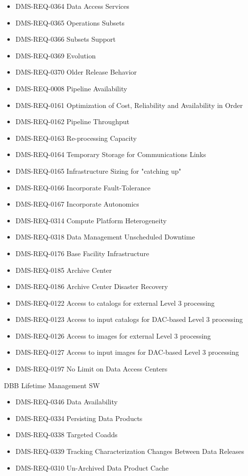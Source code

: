 \begin{itemize}
\item DMS-REQ-0364 Data Access Services
\item DMS-REQ-0365 Operations Subsets
\item DMS-REQ-0366 Subsets Support
\item DMS-REQ-0369 Evolution
\item DMS-REQ-0370 Older Release Behavior
\item DMS-REQ-0008 Pipeline Availability
\item DMS-REQ-0161 Optimization of Cost, Reliability and Availability in Order
\item DMS-REQ-0162 Pipeline Throughput
\item DMS-REQ-0163 Re-processing Capacity
\item DMS-REQ-0164 Temporary Storage for Communications Links
\item DMS-REQ-0165 Infrastructure Sizing for "catching up"
\item DMS-REQ-0166 Incorporate Fault-Tolerance
\item DMS-REQ-0167 Incorporate Autonomics
\item DMS-REQ-0314 Compute Platform Heterogeneity
\item DMS-REQ-0318 Data Management Unscheduled Downtime
\item DMS-REQ-0176 Base Facility Infrastructure
\item DMS-REQ-0185 Archive Center
\item DMS-REQ-0186 Archive Center Disaster Recovery
\item DMS-REQ-0122 Access to catalogs for external Level 3 processing
\item DMS-REQ-0123 Access to input catalogs for DAC-based Level 3 processing
\item DMS-REQ-0126 Access to images for external Level 3 processing
\item DMS-REQ-0127 Access to input images for DAC-based Level 3 processing
\item DMS-REQ-0197 No Limit on Data Access Centers
\end{itemize}
DBB Lifetime Management SW \begin{itemize}
\item DMS-REQ-0346 Data Availability
\item DMS-REQ-0334 Persisting Data Products
\item DMS-REQ-0338 Targeted Coadds
\item DMS-REQ-0339 Tracking Characterization Changes Between Data Releases
\item DMS-REQ-0310 Un-Archived Data Product Cache
\end{itemize}
